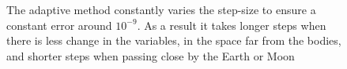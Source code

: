\begin{figure}
{        }
        \caption{The adaptive method constantly varies the step-size to ensure a constant error around $10^{-9}$. As a result it takes longer steps when there is less change in the variables, in the space far from the bodies, and shorter steps when passing close by the Earth or Moon}
        \label{fig:adaptive-step_error}
\end{figure}

\begin{figure}
    \centering
\end{figure}
